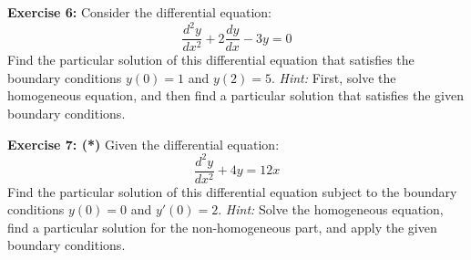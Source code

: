 \documentclass[]{article}
\begin{document}
	\textbf{Exercise 6:}
	Consider the differential equation:
	\[
	\frac{d^2y}{dx^2} + 2\frac{dy}{dx} - 3y = 0
	\]
	Find the particular solution of this differential equation that satisfies the boundary conditions \(y(0) = 1\) and \(y(2) = 5\).
	\textit{Hint:} First, solve the homogeneous equation, and then find a particular solution that satisfies the given boundary conditions.
	
	\textbf{Exercise 7: (*)}
	Given the differential equation:
	\[
	\frac{d^2y}{dx^2} + 4y = 12x
	\]
	Find the particular solution of this differential equation subject to the boundary conditions \(y(0) = 0\) and \(y'(0) = 2\).
	\textit{Hint:} Solve the homogeneous equation, find a particular solution for the non-homogeneous part, and apply the given boundary conditions.
	
	
	
\end{document}
